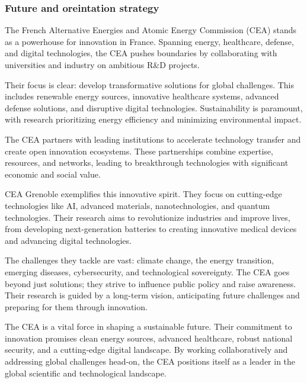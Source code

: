 \subsubsection{Future and oreintation strategy}

\medskip

The French Alternative Energies and Atomic Energy Commission (CEA) stands as a powerhouse for innovation in France.
  Spanning energy, healthcare, defense, and digital technologies, the CEA pushes boundaries by collaborating with universities
  and industry on ambitious R\&D projects.

\medskip

Their focus is clear: develop transformative solutions for global challenges. 
 This includes renewable energy sources, innovative healthcare systems, advanced defense solutions, 
 and disruptive digital technologies.  Sustainability is paramount, with research prioritizing energy 
 efficiency and minimizing environmental impact.

\medskip

The CEA partners with leading institutions to accelerate technology transfer and create open innovation ecosystems. 
 These partnerships combine expertise, resources, and networks, leading to breakthrough technologies with significant 
 economic and social value.

\medskip

CEA Grenoble exemplifies this innovative spirit. They focus on cutting-edge technologies like AI, advanced materials,
 nanotechnologies, and quantum technologies.  Their research aims to revolutionize industries and improve lives, from
 developing next-generation batteries to creating innovative medical devices and advancing digital technologies.

\medskip

The challenges they tackle are vast: climate change, the energy transition, emerging diseases, cybersecurity, and 
technological sovereignty.  The CEA goes beyond just solutions; they strive to influence public policy and raise awareness. 
 Their research is guided by a long-term vision, anticipating future challenges and preparing for them through innovation.

\medskip

The CEA is a vital force in shaping a sustainable future.  Their commitment to innovation promises clean energy sources, 
advanced healthcare, robust national security, and a cutting-edge digital landscape.  By working collaboratively and addressing
 global challenges head-on, the CEA positions itself as a leader in the global scientific and technological landscape.

